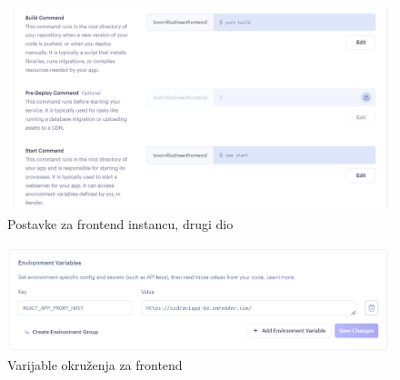 			 \begin{figure}[H]
				\includegraphics[width=\textwidth]{slike/feDeploy2.png} %
				\caption{Postavke za frontend instancu, drugi dio}
				\label{fig:feDeploy2} %
			 \end{figure}
			 
			 \begin{figure}[H]
				\includegraphics[width=\textwidth]{slike/environmentFe.png} %
				\caption{Varijable okruženja za frontend}
				\label{fig:environmentFe} %
			 \end{figure}
			
			
			\eject 